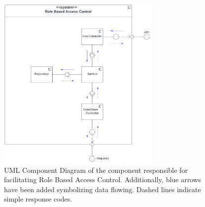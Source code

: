 \begin{figure}[ht]
    \begin{adjustbox}{center}
    \includegraphics[width=0.7\textwidth]{img/RBAC_Component_Diagram.pdf}
    \end{adjustbox}
    \caption{UML Component Diagram of the component responsible for facilitating Role Based Access Control. Additionally, blue arrows have been added symbolizing data flowing. Dashed lines indicate simple response codes. \label{fig:component_rbac}}
\end{figure}


